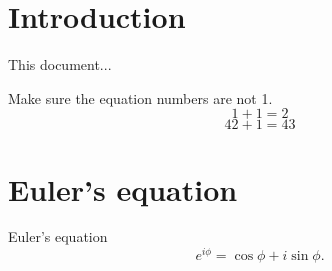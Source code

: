 \documentclass{article}
\begin{document}
\section{Introduction}

This document...

Make sure the equation numbers are not 1.
\begin{equation}
  1+1=2
  \label{eqn:foo}
\end{equation}
\begin{equation}
  42+1=43
  \label{eqn:bar}
\end{equation}

\section{Euler's equation}
\label{sec:euler}

Euler's equation
\begin{equation}
  e^{i\phi} = \cos\phi + i\sin\phi.
  \label{eqn:euler}
\end{equation}
\end{document}
